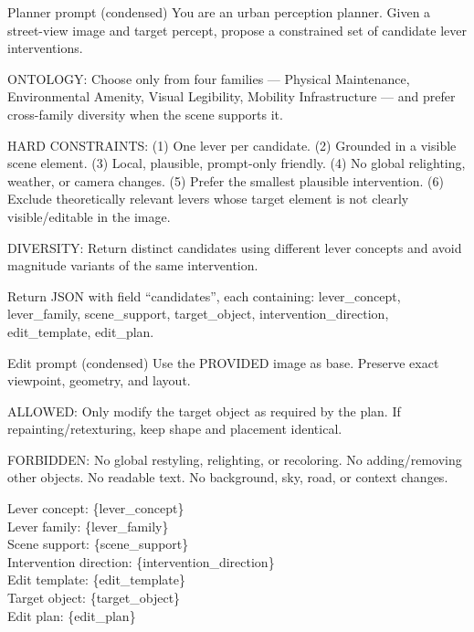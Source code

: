 \begin{promptbox}{Planner prompt (condensed)}
\scriptsize\ttfamily
You are an urban perception planner. Given a street-view image and
target percept, propose a constrained set of candidate lever
interventions.\par\medskip
ONTOLOGY: Choose only from four families --- Physical Maintenance,
Environmental Amenity, Visual Legibility, Mobility Infrastructure ---
and prefer cross-family diversity when the scene supports it.\par\medskip
HARD CONSTRAINTS: (1) One lever per candidate. (2) Grounded in a
visible scene element. (3) Local, plausible, prompt-only friendly.
(4) No global relighting, weather, or camera changes. (5) Prefer
the smallest plausible intervention. (6) Exclude theoretically
relevant levers whose target element is not clearly visible/editable
in the image.\par\medskip
DIVERSITY: Return distinct candidates using different lever concepts
and avoid magnitude variants of the same intervention.\par\medskip
Return JSON with field ``candidates'', each containing:
lever\_concept, lever\_family, scene\_support, target\_object,
intervention\_direction, edit\_template, edit\_plan.
\end{promptbox}

\begin{promptbox}{Edit prompt (condensed)}
\scriptsize\ttfamily
Use the PROVIDED image as base. Preserve exact viewpoint, geometry,
and layout.\par\medskip
ALLOWED: Only modify the target object as required by the plan.
If repainting/retexturing, keep shape and placement identical.\par\medskip
FORBIDDEN: No global restyling, relighting, or recoloring. No
adding/removing other objects. No readable text. No background,
sky, road, or context changes.\par\medskip
Lever concept: \{lever\_concept\} \\
Lever family: \{lever\_family\} \\
Scene support: \{scene\_support\} \\
Intervention direction: \{intervention\_direction\} \\
Edit template: \{edit\_template\} \\
Target object: \{target\_object\} \\
Edit plan: \{edit\_plan\}
\end{promptbox}

